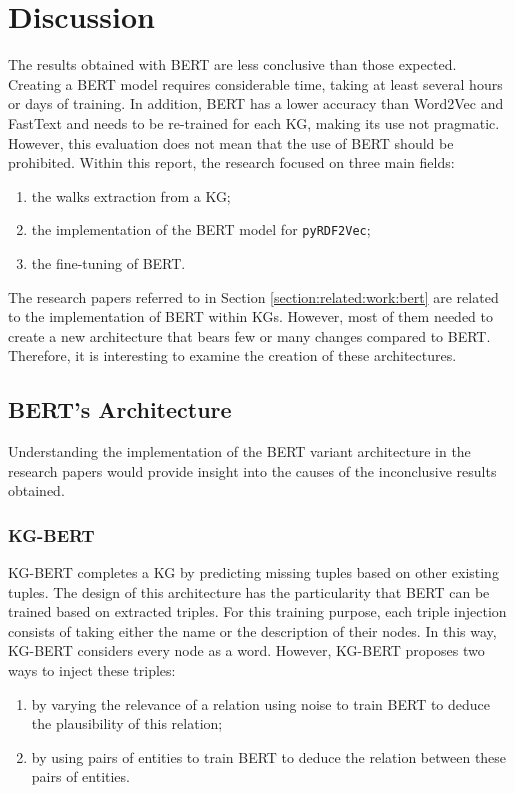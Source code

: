 
\chapter{Discussion}
\label{chap:discussion}

The results obtained with BERT are less conclusive than those expected. Creating
a BERT model requires considerable time, taking at least several hours or days
of training. In addition, BERT has a lower accuracy than Word2Vec and FastText
and needs to be re-trained for each KG, making its use not pragmatic. However,
this evaluation does not mean that the use of BERT should be prohibited. Within
this report, the research focused on three main fields:
\begin{enumerate}
\item the walks extraction from a KG;
\item the implementation of the BERT model for \texttt{pyRDF2Vec};
\item the fine-tuning of BERT.
\end{enumerate}

The research papers referred to in Section \ref{section:related:work:bert} are
related to the implementation of BERT within KGs. However, most of them needed
to create a new architecture that bears few or many changes compared to
BERT. Therefore, it is interesting to examine the creation of these
architectures.

\section{BERT's Architecture}
\label{sec:discussion:architecture}

Understanding the implementation of the BERT variant architecture in the
research papers would provide insight into the causes of the inconclusive
results obtained.

\subsection{KG-BERT}
\label{chap:discussion:kg-bert}

KG-BERT completes a KG by predicting missing tuples based on other existing
tuples. The design of this architecture has the particularity that BERT can be
trained based on extracted triples. For this training purpose, each triple
injection consists of taking either the name or the description of their
nodes. In this way, KG-BERT considers every node as a word. However, KG-BERT
proposes two ways to inject these triples:
\begin{enumerate}
\item by varying the relevance of a relation using noise to train BERT to deduce
the plausibility of this relation;
\item by using pairs of entities to train BERT to deduce the relation between
these pairs of entities.
\end{enumerate}

